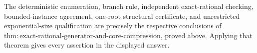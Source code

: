 The deterministic enumeration, branch rule, independent exact-rational
checking, bounded-instance agreement, one-root structural certificate, and
unrestricted exponential-size qualification are precisely the respective
conclusions of
\(\mathrm{thm{:}exact\text{-}rational\text{-}generator\text{-}and\text{-}core\text{-}compression}\),
proved above.  Applying that theorem gives every assertion in the displayed
answer.
